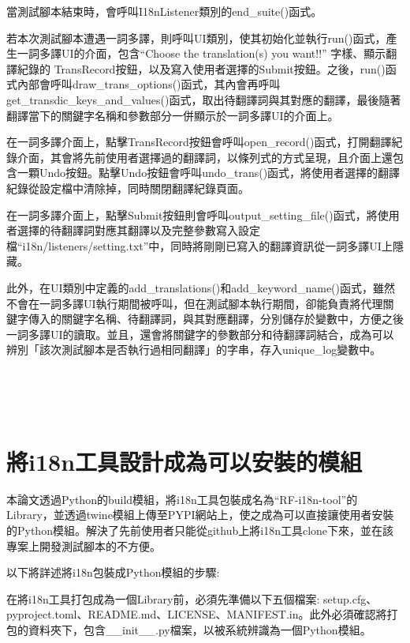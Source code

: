 當測試腳本結束時，會呼叫I18nListener類別的end\_suite()函式。

若本次測試腳本遭遇一詞多譯，則呼叫UI類別，使其初始化並執行run()函式，產生一詞多譯UI的介面，包含“Choose the translation(s) you want!!” 字樣、顯示翻譯紀錄的 TransRecord按鈕，以及寫入使用者選擇的Submit按鈕。之後，run()函式內部會呼叫draw\_trans\_options()函式，其內會再呼叫get\_transdic\_keys\_and\_values()函式，取出待翻譯詞與其對應的翻譯，最後隨著翻譯當下的關鍵字名稱和參數部分一併顯示於一詞多譯UI的介面上。

在一詞多譯介面上，點擊TransRecord按鈕會呼叫open\_record()函式，打開翻譯紀錄介面，其會將先前使用者選擇過的翻譯詞，以條列式的方式呈現，且介面上還包含一顆Undo按鈕。點擊Undo按鈕會呼叫undo\_trans()函式，將使用者選擇的翻譯紀錄從設定檔中清除掉，同時關閉翻譯紀錄頁面。

在一詞多譯介面上，點擊Submit按鈕則會呼叫output\_setting\_file()函式，將使用者選擇的待翻譯詞對應其翻譯以及完整參數寫入設定檔“i18n/listeners/setting.txt”中，同時將剛剛已寫入的翻譯資訊從一詞多譯UI上隱藏。

此外，在UI類別中定義的add\_translations()和add\_keyword\_name()函式，雖然不會在一詞多譯UI執行期間被呼叫，但在測試腳本執行期間，卻能負責將代理關鍵字傳入的關鍵字名稱、待翻譯詞，與其對應翻譯，分別儲存於變數中，方便之後一詞多譯UI的讀取。並且，還會將關鍵字的參數部分和待翻譯詞結合，成為可以辨別「該次測試腳本是否執行過相同翻譯」的字串，存入unique\_log變數中。

\hspace*{\fill} \\
\\ \hspace*{\fill} \\

\section{將i18n工具設計成為可以安裝的模組}
本論文透過Python的build模組，將i18n工具包裝成名為“RF-i18n-tool”的Library，並透過twine模組上傳至PYPI\cite{PYPI}網站上，使之成為可以直接讓使用者安裝的Python模組。解決了先前使用者只能從github上將i18n工具clone下來，並在該專案上開發測試腳本的不方便。

以下將詳述將i18n包裝成Python模組的步驟:

在將i18n工具打包成為一個Library前，必須先準備以下五個檔案: setup.cfg、pyproject.toml、README.md、LICENSE\cite{license}、MANIFEST.in。此外必須確認將打包的資料夾下，包含\_\_init\_\_.py檔案，以被系統辨識為一個Python模組。

